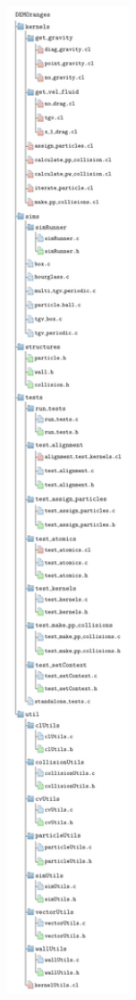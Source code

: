 \documentclass[../Interim_Report_Master]{subfiles}
\begin{document}
\begin{figure}
	\centering
	\includegraphics*[width=0.5\textwidth, trim=0 425 0 575, clip]{./Diagrams/DEMOranges_Structure/DEMOranges_Structure.pdf}
\end{figure}
\end{document}
